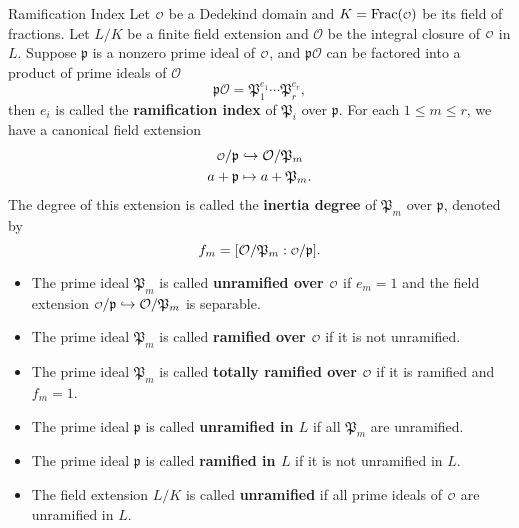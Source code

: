 \begin{definition}{Ramification Index}{}
    Let $\mathcalo$ be a Dedekind domain and $K=\mathrm{Frac}(\mathcalo)$ be its field of fractions. Let $L/K$ be a finite field extension and $\mathcal{O}$ be the integral closure of $\mathcalo$ in $L$. Suppose $\mathfrak{p}$ is a nonzero prime ideal of $\mathcalo$, and $\mathfrak{p}\mathcal{O}$ can be factored into a product of prime ideals of $\mathcal{O}$ 
    \[
    \mathfrak{p}\mathcal{O}=\mathfrak{P}_1^{e_1}\cdots\mathfrak{P}_r^{e_r},
    \]
    then $e_i$ is called the \textbf{ramification index} of $\mathfrak{P}_i$ over $\mathfrak{p}$. For each $1\le m\le r$, 
    we have a canonical field extension 
    \begin{align*}
        \mathcalo/\mathfrak{p}&\hookrightarrow \mathcal{O}/\mathfrak{P}_m\\
        a+\mathfrak{p}&\mapsto a+\mathfrak{P}_m.
    \end{align*}
    The degree of this extension is called the \textbf{inertia degree} of $\mathfrak{P}_m$ over $\mathfrak{p}$, denoted by 
    \[
    f_m=[\mathcal{O}/\mathfrak{P}_m:\mathcalo/\mathfrak{p}].
    \]
    \begin{itemize}
        \item The prime ideal $\mathfrak{P}_m$ is called \textbf{unramified over $\mathcalo$} if $e_m=1$ and the field extension $\mathcalo/\mathfrak{p}\hookrightarrow \mathcal{O}/\mathfrak{P}_m$ is separable.
        \item The prime ideal $\mathfrak{P}_m$ is called \textbf{ramified over $\mathcalo$} if it is not unramified.
        \item The prime ideal $\mathfrak{P}_m$ is called \textbf{totally ramified over $\mathcalo$} if it is ramified and $f_m=1$.
        \item The prime ideal $\mathfrak{p}$ is called \textbf{unramified in $L$} if all $\mathfrak{P}_m$ are unramified.
        \item The prime ideal $\mathfrak{p}$ is called \textbf{ramified in $L$} if it is not unramified in $L$.
        \item The field extension $L/K$ is called \textbf{unramified} if all prime ideals of $\mathcalo$ are unramified in $L$.
    \end{itemize}
\end{definition}
